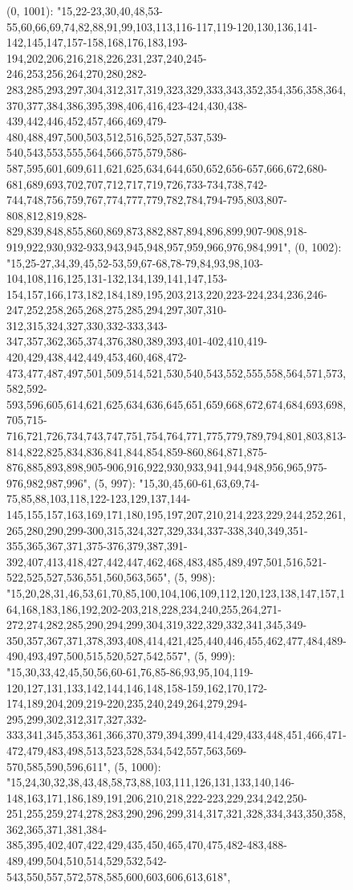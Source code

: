 \begin{figure}[H]
\begin{CacheMeCode}
{    (0, 1001): "15,22-23,30,40,48,53-55,60,66,69,74,82,88,91,99,103,113,116-117,119-120,130,136,141-142,145,147,157-158,168,176,183,193-194,202,206,216,218,226,231,237,240,245-246,253,256,264,270,280,282-283,285,293,297,304,312,317,319,323,329,333,343,352,354,356,358,364,370,377,384,386,395,398,406,416,423-424,430,438-439,442,446,452,457,466,469,479-480,488,497,500,503,512,516,525,527,537,539-540,543,553,555,564,566,575,579,586-587,595,601,609,611,621,625,634,644,650,652,656-657,666,672,680-681,689,693,702,707,712,717,719,726,733-734,738,742-744,748,756,759,767,774,777,779,782,784,794-795,803,807-808,812,819,828-829,839,848,855,860,869,873,882,887,894,896,899,907-908,918-919,922,930,932-933,943,945,948,957,959,966,976,984,991",
    (0, 1002): "15,25-27,34,39,45,52-53,59,67-68,78-79,84,93,98,103-104,108,116,125,131-132,134,139,141,147,153-154,157,166,173,182,184,189,195,203,213,220,223-224,234,236,246-247,252,258,265,268,275,285,294,297,307,310-312,315,324,327,330,332-333,343-347,357,362,365,374,376,380,389,393,401-402,410,419-420,429,438,442,449,453,460,468,472-473,477,487,497,501,509,514,521,530,540,543,552,555,558,564,571,573,582,592-593,596,605,614,621,625,634,636,645,651,659,668,672,674,684,693,698,705,715-716,721,726,734,743,747,751,754,764,771,775,779,789,794,801,803,813-814,822,825,834,836,841,844,854,859-860,864,871,875-876,885,893,898,905-906,916,922,930,933,941,944,948,956,965,975-976,982,987,996",
    (5, 997): "15,30,45,60-61,63,69,74-75,85,88,103,118,122-123,129,137,144-145,155,157,163,169,171,180,195,197,207,210,214,223,229,244,252,261,265,280,290,299-300,315,324,327,329,334,337-338,340,349,351-355,365,367,371,375-376,379,387,391-392,407,413,418,427,442,447,462,468,483,485,489,497,501,516,521-522,525,527,536,551,560,563,565",
    (5, 998): "15,20,28,31,46,53,61,70,85,100,104,106,109,112,120,123,138,147,157,164,168,183,186,192,202-203,218,228,234,240,255,264,271-272,274,282,285,290,294,299,304,319,322,329,332,341,345,349-350,357,367,371,378,393,408,414,421,425,440,446,455,462,477,484,489-490,493,497,500,515,520,527,542,557",
    (5, 999): "15,30,33,42,45,50,56,60-61,76,85-86,93,95,104,119-120,127,131,133,142,144,146,148,158-159,162,170,172-174,189,204,209,219-220,235,240,249,264,279,294-295,299,302,312,317,327,332-333,341,345,353,361,366,370,379,394,399,414,429,433,448,451,466,471-472,479,483,498,513,523,528,534,542,557,563,569-570,585,590,596,611",
    (5, 1000): "15,24,30,32,38,43,48,58,73,88,103,111,126,131,133,140,146-148,163,171,186,189,191,206,210,218,222-223,229,234,242,250-251,255,259,274,278,283,290,296,299,314,317,321,328,334,343,350,358,362,365,371,381,384-385,395,402,407,422,429,435,450,465,470,475,482-483,488-489,499,504,510,514,529,532,542-543,550,557,572,578,585,600,603,606,613,618",
}
\end{CacheMeCode}
\end{figure}
